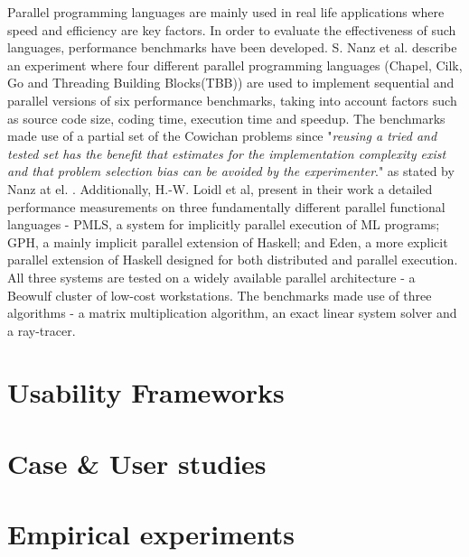 Parallel programming languages are mainly used in real life applications where speed and efficiency are key factors. In order to evaluate the effectiveness of such languages, performance benchmarks have been developed. S. Nanz et al. \cite{MulticoreLangs} describe an experiment where four different parallel programming languages (Chapel, Cilk, Go and Threading Building Blocks(TBB)) are used to implement sequential and parallel versions of six performance benchmarks, taking into account factors such as source code size, coding time, execution time and speedup. The benchmarks made use of a partial set of the Cowichan problems \cite{CowichanProblems} since "\textit{reusing a tried and tested set has the benefit that
estimates for the implementation complexity exist and that
problem selection bias can be avoided by the experimenter}." as stated by Nanz at el. \cite{MulticoreLangs}. Additionally, H.-W. Loidl et al, present in their work a detailed performance measurements on three fundamentally different parallel functional languages -  PMLS, a system for implicitly parallel execution of ML programs; GPH, a mainly implicit parallel extension of Haskell; and Eden, a more explicit parallel extension of Haskell designed for both distributed and parallel execution. All three systems are tested on a widely available parallel architecture - a Beowulf cluster of low-cost workstations. The benchmarks made use of three algorithms - a matrix multiplication algorithm, an exact linear system solver and a ray-tracer. 

\section{Usability Frameworks}

\section{Case \& User studies}

\section{Empirical experiments}